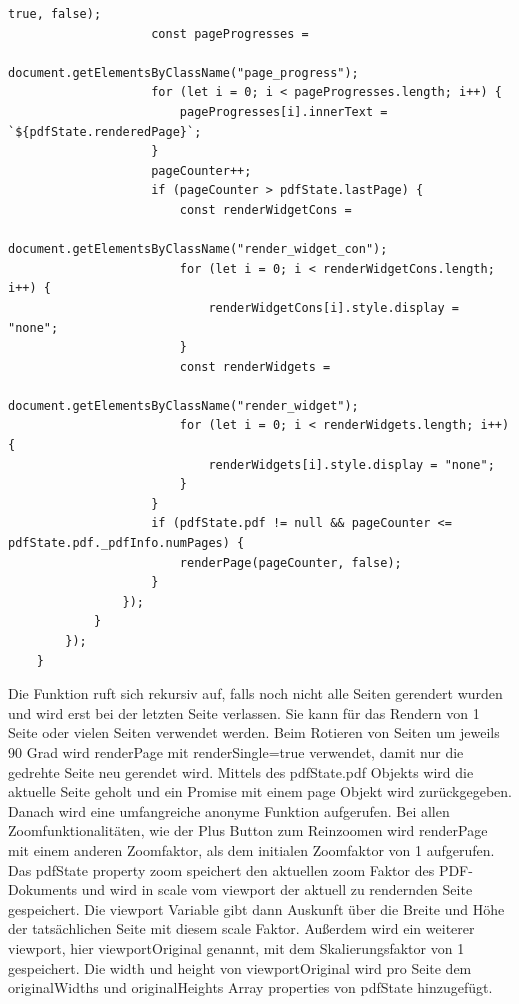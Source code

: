 \begin{lstlisting}[style=ES6, caption={Renderfunktion}, label=code:render]
						true, false);
					const pageProgresses = 
						document.getElementsByClassName("page_progress");
					for (let i = 0; i < pageProgresses.length; i++) {
						pageProgresses[i].innerText = `${pdfState.renderedPage}`;
					}
					pageCounter++;
					if (pageCounter > pdfState.lastPage) {
						const renderWidgetCons = 
							document.getElementsByClassName("render_widget_con");
						for (let i = 0; i < renderWidgetCons.length; i++) {
							renderWidgetCons[i].style.display = "none";
						}
						const renderWidgets = 
							document.getElementsByClassName("render_widget");
						for (let i = 0; i < renderWidgets.length; i++) {
							renderWidgets[i].style.display = "none";
						}
					} 
					if (pdfState.pdf != null && pageCounter <= pdfState.pdf._pdfInfo.numPages) {
						renderPage(pageCounter, false);
					}
				});
			}
		});
	}
\end{lstlisting} 

Die Funktion ruft sich rekursiv auf, falls noch nicht alle Seiten gerendert wurden und wird erst bei der letzten Seite verlassen. Sie kann für das Rendern von 1 Seite oder vielen Seiten verwendet werden. Beim Rotieren von Seiten um jeweils 90 Grad wird renderPage mit renderSingle=true verwendet, damit nur die gedrehte Seite neu gerendet wird. Mittels des pdfState.pdf Objekts wird die aktuelle Seite geholt und ein Promise mit einem page Objekt wird zurückgegeben. Danach wird eine umfangreiche anonyme Funktion aufgerufen. Bei allen Zoomfunktionalitäten, wie der Plus Button zum Reinzoomen wird renderPage mit einem anderen Zoomfaktor, als dem initialen Zoomfaktor von 1 aufgerufen. Das pdfState property zoom speichert den aktuellen zoom Faktor des PDF-Dokuments und wird in scale vom viewport der aktuell zu rendernden Seite gespeichert. Die viewport Variable gibt dann Auskunft über die Breite und Höhe der tatsächlichen Seite mit diesem scale Faktor. Außerdem wird ein weiterer viewport, hier viewportOriginal genannt, mit dem Skalierungsfaktor von 1 gespeichert. Die width und height von viewportOriginal wird pro Seite dem originalWidths und originalHeights Array properties von pdfState hinzugefügt.